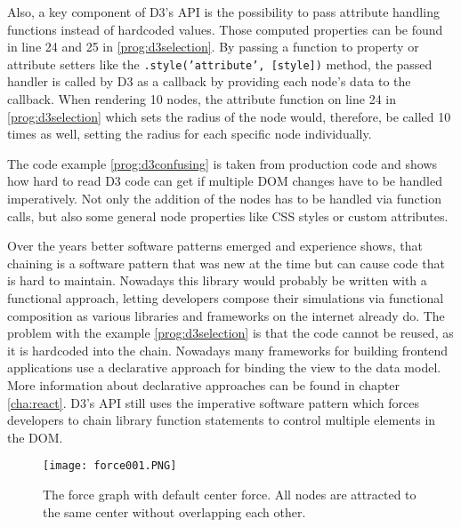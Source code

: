 Also, a key component of D3's API is the possibility to pass attribute handling functions instead of hardcoded values. Those computed properties can be found in line 24 and 25 in \ref{prog:d3selection}. By passing a function to property or attribute setters like the \texttt{.style('attribute', [style])} method, the passed handler is called by D3 as a callback by providing each node's data to the callback. When rendering 10 nodes, the attribute function on line 24 in \ref{prog:d3selection} which sets the radius of the node would, therefore, be called 10 times as well, setting the radius for each specific node individually.

The code example \ref{prog:d3confusing} is taken from production code and shows how hard to read D3 code can get if multiple DOM changes have to be handled imperatively. Not only the addition of the nodes has to be handled via function calls, but also some general node properties like CSS styles or custom attributes.

Over the years better software patterns emerged and experience shows, that chaining is a software pattern that was new at the time but can cause code that is hard to maintain. Nowadays this library would probably be written with a functional approach, letting developers compose their simulations via functional composition as various libraries and frameworks on the internet already do. The problem with the example \ref{prog:d3selection} is that the code cannot be reused, as it is hardcoded into the chain. Nowadays many frameworks for building frontend applications use a declarative approach for binding the view to the data model. More information about declarative approaches can be found in chapter \ref{cha:react}. D3's API still uses the imperative software pattern which forces developers to chain library function statements to control multiple elements in the DOM.



\begin{figure}
  \centering
  \texttt{[image: force001.PNG]}
  \caption{The force graph with default center force. All nodes are attracted to the same center without overlapping each other.}
  \label{fig:force001}
\end{figure}

